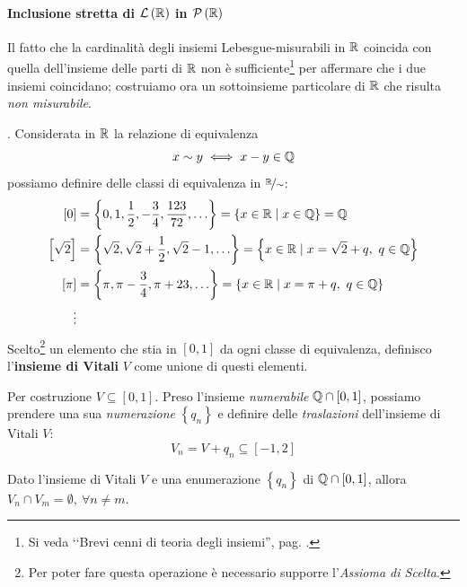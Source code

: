 \paragraph{Inclusione stretta di {$\mathcal{L}\left(\mathbb{R}\right)$} in {$\mathcal{P}\left(\mathbb{R}\right)$}}
Il fatto che la cardinalità degli insiemi Lebesgue-misurabili in $\mathbb{R}$ coincida con quella dell'insieme delle parti di $\mathbb{R}$ non è sufficiente\footnote{Si veda ‘‘Brevi cenni di teoria degli insiemi'', pag. \pageref{cardinalitàugualenonimplicauguaglianzainsiemistica}.} per affermare che i due insiemi coincidano; costruiamo ora un sottoinsieme particolare di $\mathbb{R}$ che risulta \textit{non misurabile}.
\begin{define}\label{vitali}.
	Considerata in $\mathbb{R}$ la relazione di equivalenza
	\begin{equation}
		x\sim y\iff x-y\in\mathbb{Q}
	\end{equation}
	possiamo definire delle classi di equivalenza in $\nicefrac{\mathbb{R}}{\sim}$:
	\begin{align*}
		\left[0\right]&=\left\{0,1,\frac{1}{2},-\frac{3}{4},\frac{123}{72},\ldots\right\}=\left\{x\in\mathbb{R}\mid x\in\mathbb{Q}\right\}=\mathbb{Q}\\
		\left[\sqrt{2}\right]&=\left\{\sqrt{2},\sqrt{2}+\frac{1}{2},\sqrt{2}-1,\ldots\right\}=\left\{x\in\mathbb{R}\mid x=\sqrt{2}+q,\ q\in\mathbb{Q}\right\}\\
		\left[\pi\right]&=\left\{\pi,\pi-\frac{3}{4},\pi+23,\ldots\right\}=\left\{x\in\mathbb{R}\mid x=\pi+q,\ q\in\mathbb{Q}\right\}\\
		\vdots
	\end{align*}
	Scelto\footnote{Per poter fare questa operazione è necessario supporre l'\textit{Assioma di Scelta}.} un elemento che stia in $\left[0,1\right]$ da ogni classe di equivalenza, definisco l'\textbf{insieme di Vitali} $V$ come unione di questi elementi.
\end{define}
Per costruzione $V\subseteq\left[0,1\right]$. Preso l'insieme \textit{numerabile} $\mathbb{Q}\cap\left[0,1\right]$, possiamo prendere una sua \textit{numerazione} $\left\{q_n\right\}$ e definire delle \textit{traslazioni} dell'insieme di Vitali $V$:
\begin{equation*}
	V_n=V+q_n\subseteq\left[-1,2\right]
\end{equation*}
\begin{lemming}
	Dato l'insieme di Vitali $V$  e una enumerazione $\left\{q_n\right\}$  di $\mathbb{Q}\cap\left[0,1\right]$, allora $V_n\cap V_m=\emptyset,\ \forall n\neq m$.
\end{lemming}
